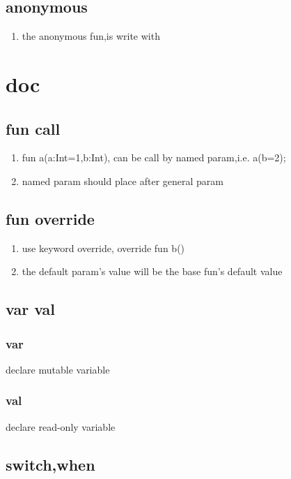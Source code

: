 \documentclass{article}
\begin{document}
            \subsection{anonymous}
                \begin{enumerate}
                    \item the anonymous fun,is write with {}
                \end{enumerate}
\newpage
\section{doc}
    \subsection{fun call}
         \begin{enumerate}
            \item fun a(a:Int=1,b:Int){}, can be call by named param,i.e. a(b=2);
            \item named param should place after general param
         \end{enumerate}
    \subsection{fun override}
         \begin{enumerate}
             \item use keyword override, override fun b(){}
             \item the default param's value will be the base fun's default value
         \end{enumerate}
    \subsection{var val}
         \subsubsection{var}
            declare mutable variable
         \subsubsection{val}
            declare read-only variable
    \subsection{switch,when}
         
\end{document}
